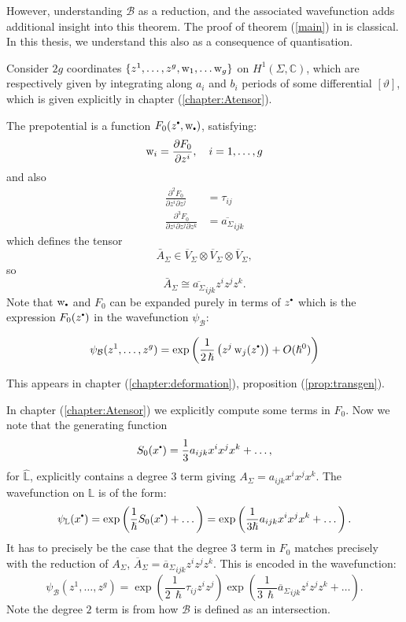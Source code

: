     However, understanding \( \mathcal{B}\) as a reduction, and the associated wavefunction adds additional insight into this theorem. The proof of theorem (\ref{main}) in \cite{bhuespe} is classical. In this thesis, we understand this also as a consequence of quantisation.
    
    Consider \(2g\) coordinates \( \{z^1, \dots , z^g, \mathrm{w}_1, \dots \mathrm{w}_g \}\) on \(H^1(\Sigma, \mathbb{C})\), which are respectively given by integrating along \(a_i\) and \(b_i\) periods of some differential \( [\vartheta]\), which is given explicitly in chapter (\ref{chapter:Atensor}).

    The prepotential is a function \(F_0(z^{\sbt},\w_{\sbt})\), satisfying:
    \[ \mathrm{w}_i=\frac{\partial F_0}{\partial z^i},\quad i=1,\dots,g \]
    and also 
    \begin{align*} \frac{\partial^2 F_0}{\partial z^i\partial z^j}&=\tau_{ij} \\ 
    \frac{\partial^3 F_0}{\partial z^i\partial z^j\partial z^k}&=\overline{{a_\Sigma}}_{ijk}
    \end{align*}
    which defines the tensor \[ \bar{A}_\Sigma\in\overline{V}_\Sigma\otimes\overline{V}_\Sigma\otimes\overline{V}_\Sigma,\]
    so 
    \[\bar{A}_\Sigma \cong \overline{{a_\Sigma}}_{ijk} z^i z^j z^k. \]
    Note that \(\w_{\sbt}\) and \(F_0\) can be expanded purely in terms of \(z^{\sbt}\) which is the expression \(F_0(z^{\sbt})\) in the wavefunction \( \psi_{\mathcal{B}}\):
    \begin{prop}
    \begin{equation}
        \psi_{\mathcal{B}}(z^1, \dots,z^g) = \exp \left( \frac{1}{2\, \hslash} \left(  z^j \, \w_j(z^{\sbt}) \right)+ O(\hslash^0) \right) 
    \end{equation}
    \end{prop}
    This appears in chapter (\ref{chapter:deformation}), proposition (\ref{prop:transgen}).
    
    In chapter (\ref{chapter:Atensor}) we explicitly compute some terms in \(F_0\).
    Now we note that the generating function \[S_0(x^{\sbt}) =\frac{1}{3} a_{ijk} x^i x^j x^k + \dots, \] for \( \widehat{\mathbb{L}} \), explicitly contains a degree \(3\) term giving \( A_\Sigma = a_{ijk}x^i x^j x^k\). The wavefunction on \( \mathbb{L}\) is of the form:
    \[ \psi_{\mathbb{L}}(x^{\sbt}) = \exp\left( \frac{1}{\hslash} S_0(x^{\sbt}) + \dots \right) = \exp \left( \frac{1}{3 \hslash} a_{ijk}x^i x^j x^k + \dots \right). \]
    It has to precisely be the case that the degree \(3\) term in \(F_0\) matches precisely with the reduction of \(A_\Sigma\), \( \overline{A}_\Sigma = {\overline{a}_\Sigma}_{ijk} z^i z^j z^k\). This is encoded in the wavefunction:
    \[ \psi_{\mathcal{B}}(z^1, \dots,z^g) = \exp\left( \frac{1}{2\, \hslash} \tau_{ij}  z^i z^j \right) \exp \left(  \frac{1}{3\, \hslash} {\overline{a}_\Sigma}_{ijk} z^i z^j z^k + \dots \right). \]
    Note the degree \(2\) term is from how \( \mathcal{B}\) is defined as an intersection. 
    

